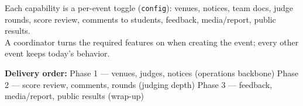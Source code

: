 \documentclass[11pt,a4paper]{article}
\begin{document}
\noindent Each capability is a per-event toggle (\texttt{config}): venues, notices, team docs, judge rounds, score review, comments to students, feedback, media/report, public results.\\
A coordinator turns the required features on when creating the event; every other event keeps today's behavior.

\vspace{1em}
\begin{tcolorbox}[colback=softgray,colframe=gold,boxrule=1pt,arc=2pt,left=10pt,right=10pt,top=8pt,bottom=8pt]
{\color{navy}\bfseries Delivery order:}\quad
Phase 1 --- venues, judges, notices (operations backbone) \textbullet
Phase 2 --- score review, comments, rounds (judging depth) \textbullet
Phase 3 --- feedback, media/report, public results (wrap-up)
\end{tcolorbox}
\end{document}
